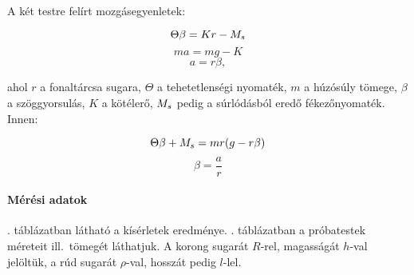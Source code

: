 \documentclass[12pt]{article}
\begin{document}
A két testre felírt mozgásegyenletek:

\[
\Theta\beta=Kr-M_s \\
\]
\[
ma=mg-K
\]
\[
a=r\beta,
\]

ahol $r$ a fonaltárcsa sugara, $\Theta$ a tehetetlenségi nyomaték, $m$ a húzósúly tömege, $\beta$ a szöggyorsulás, $K$ a kötélerő, $M_s$ pedig a súrlódásból eredő fékezőnyomaték.
Innen:

\[
\begin{equation}
\Theta\beta + \Ms = mr(g-r\beta)
\label{eq:egyenes}
\end{equation}
\]
\[
\beta=\frac ar
\]


\paragraph*{Mérési adatok}

. táblázatban látható a kísérletek eredménye. . táblázatban a próbatestek méreteit ill.\ tömegét láthatjuk. A korong sugarát $R$-rel, magasságát $h$-val jelöltük, a rúd sugarát $\rho$-val, hosszát pedig $l$-lel.
\end{document}
